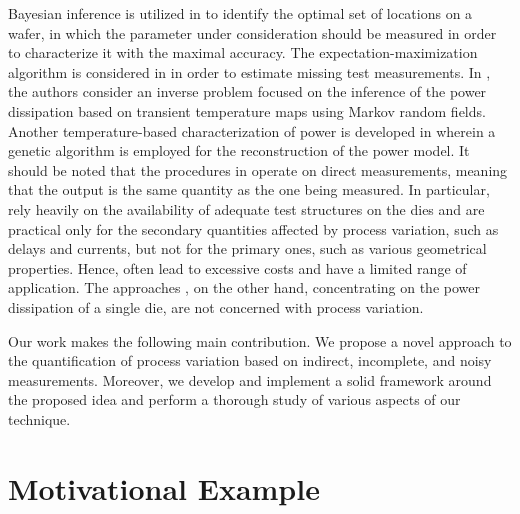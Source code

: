 Bayesian inference is utilized in \cite{zhang2010} to identify the optimal set
of locations on a wafer, in which the parameter under consideration should be
measured in order to characterize it with the maximal accuracy. The
expectation-maximization algorithm is considered in \cite{reda2009} in order to
estimate missing test measurements. In \cite{paek2012}, the authors consider an
inverse problem focused on the inference of the power dissipation based on
transient temperature maps using Markov random fields. Another temperature-based
characterization of power is developed in \cite{mesa-martinez2007} wherein a
genetic algorithm is employed for the reconstruction of the power model. It
should be noted that the procedures in \cite{zhang2010, reda2009} operate on
direct measurements, meaning that the output is the same quantity as the one
being measured. In particular, \cite{zhang2010, reda2009} rely heavily on the
availability of adequate test structures on the dies and are practical only for
the secondary quantities affected by process variation, such as delays and
currents, but not for the primary ones, such as various geometrical properties.
Hence, \cite{zhang2010, reda2009} often lead to excessive costs and have a
limited range of application. The approaches \cite{paek2012, mesa-martinez2007},
on the other hand, concentrating on the power dissipation of a single die, are
not concerned with process variation.

Our work makes the following main contribution. We propose a novel approach to
the quantification of process variation based on indirect, incomplete, and noisy
measurements. Moreover, we develop and implement a solid framework around the
proposed idea and perform a thorough study of various aspects of our technique.

\section{Motivational Example}

